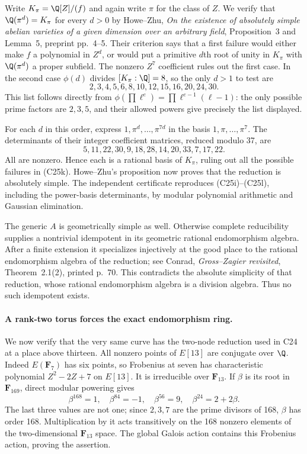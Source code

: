 Write $K_\pi=\Q[Z]/(f)$ and again write $\pi$ for the
class of $Z$. We verify that $\Q(\pi^d)=K_\pi$ for
every $d>0$ by Howe--Zhu, \emph{On the existence of
absolutely simple abelian varieties of a given dimension
over an arbitrary field}, Proposition~3 and Lemma~5,
preprint pp.~4--5. Their criterion says that a first
failure would either make $f$ a polynomial in $Z^d$,
or would put a primitive $d$th root of unity in
$K_\pi$ with $\Q(\pi^d)$ a proper subfield.
The nonzero $Z^7$ coefficient rules out the first case.
In the second case $\phi(d)$ divides $[K_\pi:\Q]=8$,
so the only $d>1$ to test are
\[
 2,3,4,5,6,8,10,12,15,16,20,24,30.
 \tag{C25k}
\]
This list follows directly from
$\phi(\prod\ell^e)=\prod\ell^{e-1}(\ell-1)$:
the only possible prime factors are $2,3,5$, and their
allowed powers give precisely the list displayed.

For each $d$ in this order, express
$1,\pi^d,\ldots,\pi^{7d}$ in the basis
$1,\pi,\ldots,\pi^7$. The determinants of their
integer coefficient matrices, reduced modulo 37, are
\[
 5,11,22,30,9,18,28,14,20,33,7,17,22.
 \tag{C25l}
\]
All are nonzero. Hence each is a rational basis of
$K_\pi$, ruling out all the possible failures in
(C25k). Howe--Zhu's proposition now proves that the
reduction is absolutely simple. The independent
certificate reproduces (C25i)--(C25l), including the
power-basis determinants, by modular polynomial
arithmetic and Gaussian elimination.

The generic $A$ is geometrically simple as well.
Otherwise complete reducibility supplies a nontrivial
idempotent in its geometric rational endomorphism
algebra. After a finite extension it specializes
injectively at the good place to the rational
endomorphism algebra of the reduction; see Conrad,
\emph{Gross--Zagier revisited}, Theorem~2.1(2),
printed p.~70. This contradicts the absolute simplicity
of that reduction, whose rational endomorphism algebra
is a division algebra. Thus no such idempotent exists.

\paragraph{A rank-two torus forces the exact endomorphism ring.}
We now verify that the very same curve has the two-node
reduction used in C24 at a place above thirteen.
All nonzero points of $E[13]$ are conjugate over $\Q$.
Indeed $E(\mathbf F_7)$ has six points, so Frobenius at
seven has characteristic polynomial
$Z^2-2Z+7$ on $E[13]$.
It is irreducible over $\mathbf F_{13}$.
If $\beta$ is its root in $\mathbf F_{169}$, direct
modular powering gives
\[
 \beta^{168}=1,\quad
 \beta^{84}=-1,\quad
 \beta^{56}=9,\quad
 \beta^{24}=2+2\beta.
 \tag{C25m}
\]
The last three values are not one; since $2,3,7$ are
the prime divisors of 168, $\beta$ has order 168.
Multiplication by it acts transitively on the 168
nonzero elements of the two-dimensional $\mathbf F_{13}$
space. The global Galois action contains this Frobenius
action, proving the assertion.

